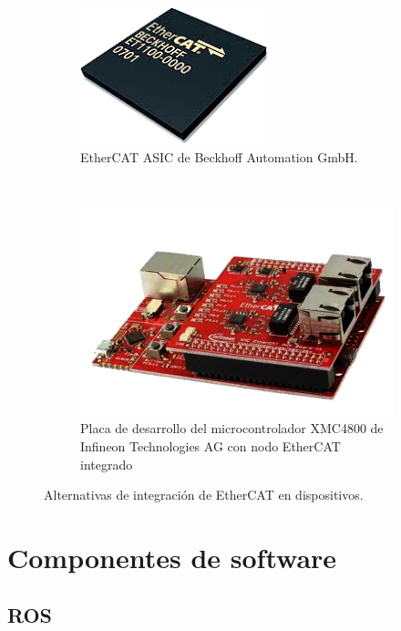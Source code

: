 \begin{figure}[H]
  \centering
  \begin{subfigure}[b]{0.4\textwidth}
    \includegraphics[width=0.6\textwidth]{img/cap2/ethercat_asic.png}
    \caption{EtherCAT ASIC de Beckhoff Automation GmbH.}
    \end{subfigure}%
    ~
  \begin{subfigure}[b]{0.4\textwidth}
    \includegraphics[width=\textwidth]{img/cap2/xmc4800}
    \caption{Placa de desarrollo del microcontrolador XMC4800 de Infineon Technologies AG con nodo EtherCAT integrado}
    \end{subfigure}
  \caption{Alternativas de integración de EtherCAT en dispositivos.}
  \label{cap2_ethercat}
\end{figure}

\section{Componentes de software}

\subsection{ROS}

